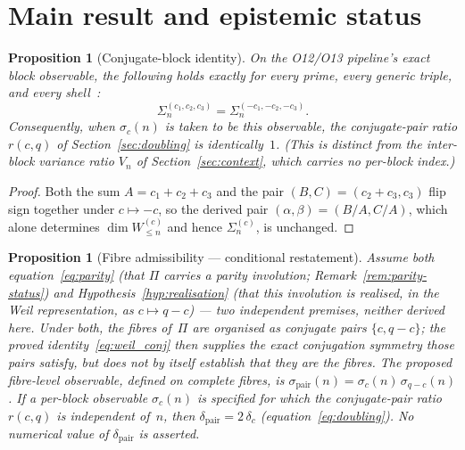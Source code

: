 \documentclass[11pt,a4paper]{article}
\newtheorem{proposition}[theorem]{Proposition}
\theoremstyle{definition}
\begin{document}
  \section{Main result and epistemic status}
  \label{sec:main}

  \begin{proposition}[Conjugate-block identity]
    \label{prop:conjugate-identity}
    On the O12/O13 pipeline's exact block observable, the following holds
    exactly for every prime, every generic triple, and every
    shell~\cite{Beau2026a16}:
    \[
      \Sigma_n^{(c_1,c_2,c_3)} = \Sigma_n^{(-c_1,-c_2,-c_3)}.
    \]
    Consequently, when $\sigma_c(n)$ is taken to be this observable, the
    conjugate-pair ratio $r(c,q)$ of Section~\ref{sec:doubling} is
    identically~$1$.
    (This is distinct from the inter-block variance ratio $V_n$ of
    Section~\ref{sec:context}, which carries no per-block index.)
  \end{proposition}

  \begin{proof}
    Both the sum $A=c_1+c_2+c_3$ and the pair $(B,C)=(c_2+c_3,c_3)$ flip
    sign together under $c\mapsto-c$, so the derived pair
    $(\alpha,\beta)=(B/A,C/A)$, which alone determines
    $\dim W_{\leq n}^{(c)}$ and hence $\Sigma_n^{(c)}$, is unchanged.
  \end{proof}

  \begin{proposition}[Fibre admissibility --- conditional restatement]
    \label{prop:main}
    Assume both equation~\eqref{eq:parity} (that $\Pi$ carries a parity
    involution; Remark~\ref{rem:parity-status}) and
    Hypothesis~\ref{hyp:realisation} (that this involution is realised, in
    the Weil representation, as $c\mapsto q-c$) --- two independent
    premises, neither derived here.
    Under both, the fibres of~$\Pi$ are organised as conjugate pairs
    $\{c, q-c\}$; the proved identity~\eqref{eq:weil_conj} then supplies
    the exact conjugation symmetry those pairs satisfy, but does not by
    itself establish that they are the fibres.
    The proposed fibre-level observable, defined on complete fibres, is
    $\sigma_{\mathrm{pair}}(n) = \sigma_c(n)\,\sigma_{q-c}(n)$.
    \emph{If} a per-block observable $\sigma_c(n)$ is specified for which
    the conjugate-pair ratio $r(c,q)$ is independent of~$n$, \emph{then}
    $\delta_{\mathrm{pair}} = 2\,\delta_c$
    (equation~\eqref{eq:doubling}).
    No numerical value of $\delta_{\mathrm{pair}}$ is asserted.
  \end{proposition}
\end{document}
